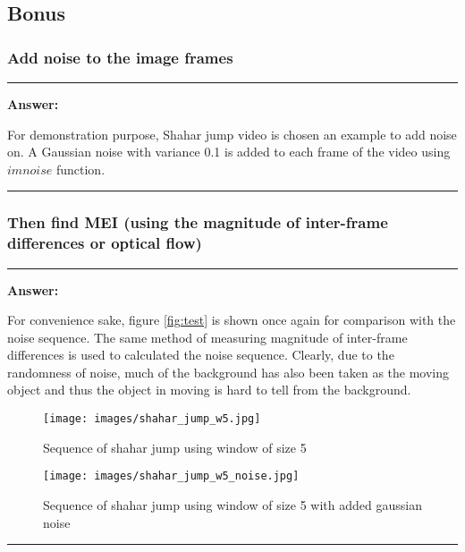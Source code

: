 \documentclass[conference]{styles/acmsiggraph}
\newenvironment{answer}{}{}
\begin{document}
	\subsection{Bonus}
	\subsubsection{Add noise to the image frames}
	\begin{answer}
		\rule{\textwidth}{0.4pt}
		\textbf{Answer:}

		For demonstration purpose, Shahar jump video is chosen an example to add noise on. A Gaussian noise with variance 0.1 is added to each frame of the video using $imnoise$ function.


		\rule{\textwidth}{0.4pt}
	\end{answer}

	\subsubsection{Then find MEI (using the magnitude of inter-frame differences or optical flow)}
	\begin{answer}

		\rule{\textwidth}{0.4pt}
		\textbf{Answer:}

		 For convenience sake, figure \ref{fig:test} is shown once again for comparison with the noise sequence. The same method of measuring magnitude of inter-frame differences is used to calculated the noise sequence. Clearly, due to the randomness of noise, much of the background has also been taken as the moving object and thus the object in moving is hard to tell from the background.

		\begin{figure}[H]
			\centering
			\texttt{[image: images/shahar\_jump\_w5.jpg]}
			\caption{Sequence of shahar jump using window of size 5}
		\end{figure}
		\begin{figure}[H]
			\centering
			\texttt{[image: images/shahar\_jump\_w5\_noise.jpg]}
			\caption{Sequence of shahar jump using window of size 5 with added gaussian noise}
		\end{figure}

		\rule{\textwidth}{0.4pt}

	\end{answer}
	
\end{document}
